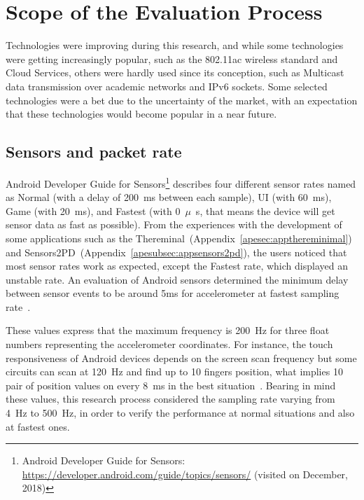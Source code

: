 \section{Scope of the Evaluation Process}
\label{sec:scope}

Technologies were improving during this research, and while some technologies were getting increasingly popular, such as the 802.11ac wireless standard and Cloud Services, others were hardly used since its conception, such as Multicast data transmission over academic networks and IPv6 sockets.
Some selected technologies were a bet due to the uncertainty of the market, with an expectation that these technologies would become popular in a near future.

\subsection*{Sensors and packet rate}

Android Developer Guide for Sensors\footnote{Android Developer Guide for Sensors: \url{https://developer.android.com/guide/topics/sensors/} (visited on December, 2018)} describes four different sensor rates named as Normal (with a delay of 200~ms between each sample), UI (with 60~ms), Game (with 20~ms), and Fastest (with 0~$\mu$~s, that means the device will get sensor data as fast as possible).
From the experiences with the development of some applications such as the Thereminal~(Appendix~\ref{apesec:appthereminimal}) and Sensors2PD~(Appendix~\ref{apesubsec:appsensors2pd}), the users noticed that most sensor rates work as expected, except the Fastest rate, which displayed an unstable rate.
An evaluation of Android sensors determined the minimum delay between sensor events to be around 5ms for accelerometer at fastest sampling rate~\citep{Ma2013experimental}.

These values express that the maximum frequency is 200~Hz for three float numbers representing the accelerometer coordinates.
For instance, the touch responsiveness of Android devices depends on the screen scan frequency but some circuits can scan at 120~Hz and find up to 10 fingers position, what implies 10 pair of position values on every 8~ms in the best situation~\citep{Padre2017touchresponsiveness}.
Bearing in mind these values, this research process considered the sampling rate varying from 4~Hz to 500~Hz, in order to verify the performance at normal situations and also at fastest ones.  

